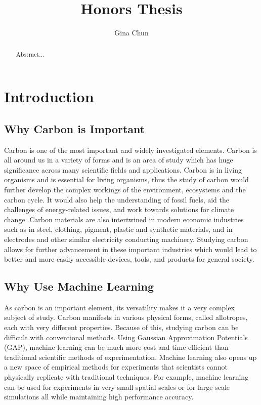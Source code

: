 \documentclass[12pt]{scrartcl}
\title{Honors Thesis}
\author{Gina Chun}
\begin{document}
\maketitle

\newpage

\begin{abstract}
  Abstract...
\end{abstract}

\newpage

\tableofcontents

\newpage

\section{Introduction}\label{Introduction}

\subsection{Why Carbon is Important}


Carbon is one of the most important and widely investigated
elements. Carbon is all around us in a variety of forms and is an area
of study which has huge significance across many scientific fields and
applications. Carbon is in living organisms and is essential for
living organisms, thus the study of carbon would further develop the
complex workings of the environment, ecosystems and the carbon
cycle. It would also help the understanding of fossil fuels, aid the
challenges of energy-related issues, and work towards solutions for
climate change. Carbon materials are also intertwined in modern
economic industries such as in steel, clothing, pigment, plastic and
synthetic materials, and in electrodes and other similar electricity
conducting machinery. Studying carbon allows for further advancement
in these important industries which would lead to better and more
easily accessible devices, tools, and products for general society.

\subsection{Why Use Machine Learning}
As carbon is an important element, its versatility makes it a very
complex subject of study. Carbon manifests in various physical forms,
called allotropes, each with very different properties. Because of
this, studying carbon can be difficult with conventional
methods. Using Gaussian Approximation Potentials (GAP), machine
learning can be much more cost and time efficient than traditional
scientific methods of experimentation. Machine learning also opens up
a new space of empirical methods for experiments that scientists
cannot physically replicate with traditional techniques. For example,
machine learning can be used for experiments in very small spatial
scales or for large scale simulations all while maintaining high
performance accuracy.
\end{document}
